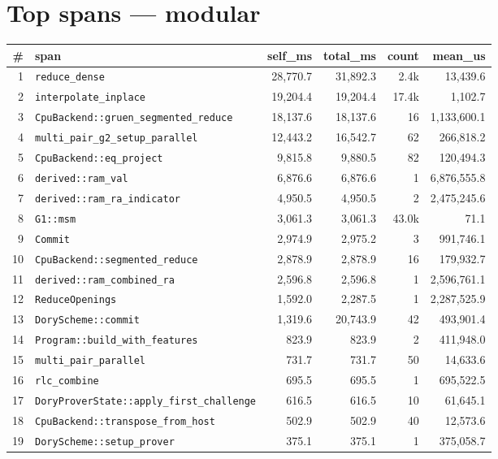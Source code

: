 \documentclass[10pt,a4paper]{article}
\begin{document}
\section{Top spans — modular}
\begin{longtable}{r l r r r r}
\toprule \textbf{\#} & \textbf{span} & \textbf{self\_ms} & \textbf{total\_ms} & \textbf{count} & \textbf{mean\_us} \\ \midrule \endhead
1 & \texttt{reduce\_dense} & 28,770.7 & 31,892.3 & 2.4k & 13,439.6 \\
2 & \texttt{interpolate\_inplace} & 19,204.4 & 19,204.4 & 17.4k & 1,102.7 \\
3 & \texttt{CpuBackend::gruen\_segmented\_reduce} & 18,137.6 & 18,137.6 & 16 & 1,133,600.1 \\
4 & \texttt{multi\_pair\_g2\_setup\_parallel} & 12,443.2 & 16,542.7 & 62 & 266,818.2 \\
5 & \texttt{CpuBackend::eq\_project} & 9,815.8 & 9,880.5 & 82 & 120,494.3 \\
6 & \texttt{derived::ram\_val} & 6,876.6 & 6,876.6 & 1 & 6,876,555.8 \\
7 & \texttt{derived::ram\_ra\_indicator} & 4,950.5 & 4,950.5 & 2 & 2,475,245.6 \\
8 & \texttt{G1::msm} & 3,061.3 & 3,061.3 & 43.0k & 71.1 \\
9 & \texttt{Commit} & 2,974.9 & 2,975.2 & 3 & 991,746.1 \\
10 & \texttt{CpuBackend::segmented\_reduce} & 2,878.9 & 2,878.9 & 16 & 179,932.7 \\
11 & \texttt{derived::ram\_combined\_ra} & 2,596.8 & 2,596.8 & 1 & 2,596,761.1 \\
12 & \texttt{ReduceOpenings} & 1,592.0 & 2,287.5 & 1 & 2,287,525.9 \\
13 & \texttt{DoryScheme::commit} & 1,319.6 & 20,743.9 & 42 & 493,901.4 \\
14 & \texttt{Program::build\_with\_features} & 823.9 & 823.9 & 2 & 411,948.0 \\
15 & \texttt{multi\_pair\_parallel} & 731.7 & 731.7 & 50 & 14,633.6 \\
16 & \texttt{rlc\_combine} & 695.5 & 695.5 & 1 & 695,522.5 \\
17 & \texttt{DoryProverState::apply\_first\_challenge} & 616.5 & 616.5 & 10 & 61,645.1 \\
18 & \texttt{CpuBackend::transpose\_from\_host} & 502.9 & 502.9 & 40 & 12,573.6 \\
19 & \texttt{DoryScheme::setup\_prover} & 375.1 & 375.1 & 1 & 375,058.7 \\

\end{longtable}
\end{document}
